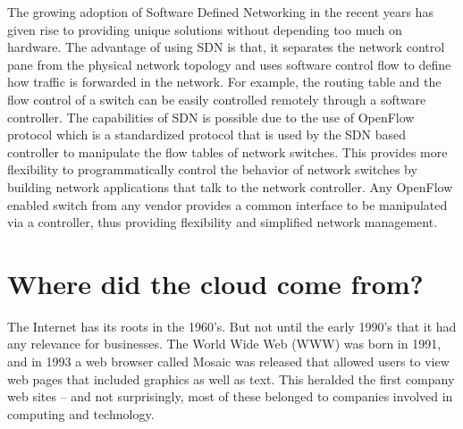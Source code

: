 The growing adoption of Software Defined Networking in the recent years has given rise to providing unique solutions without depending too much on hardware. The advantage of using SDN is that, it separates the network control pane from the physical network topology and uses software control flow to define how traffic is forwarded in the network. For example, the routing table and the flow control of a switch can be easily controlled remotely through a software controller.  The capabilities of SDN is possible due to the use of OpenFlow protocol which is a standardized protocol that is used by the SDN based controller to manipulate the flow tables of network switches. This provides more flexibility to programmatically control the behavior of network switches by building network applications that talk to the network controller. Any OpenFlow enabled switch from any vendor provides a common interface to be manipulated via a controller, thus providing flexibility and simplified network management.


\section{Where did the cloud come from?\cite{salesforce} }\label{sec:history}

The Internet has its roots in the 1960's. But not until the early 1990's that it had any relevance for businesses. The World Wide Web (WWW) was born in 1991, and in 1993 a web browser called Mosaic was released that allowed users to view web pages that included graphics as well as text. This heralded the first company web sites – and not surprisingly, most of these belonged to companies involved in computing and technology.

